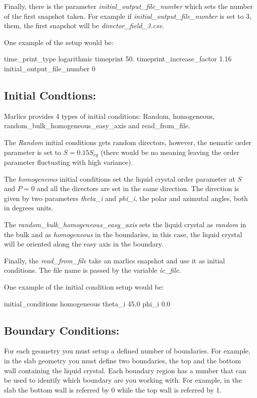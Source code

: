\documentclass{article}
\begin{document}
Finally, there is the parameter \textit{initial_output_file_number} which sets the number of the first snapshot taken. For example if \textit{initial_output_file_number} is set to 3, them, the first snapshot will be \textit{director_field_3.csv}.

One example of the setup would be:

time_print_type	          logarithmic
timeprint                 50.        %
timeprint_increase_factor 1.16       %
initial_output_file_number   0


\subsection{Initial Condtions:}

Marlics provides 4 types of initial conditions: Random, homogeneous, random_bulk_homogeneous_easy_axis and read_from_file.

The \textit{Random} initial conditions gets random directors, however, the nematic order parameter is set to $S=0.15 S_{eq}$ (there would be no meaning leaving the order parameter fluctuating with high variance).

The \textit{homogeneous} initial conditions set the liquid crystal order parameter at $S$ and $P=0$ and all the directors are set in the same direction. The direction is given by two parameters \textit{theta_i} and \textit{phi_i}, the polar and azimutal angles, both in degrees units.

The \textit{random_bulk_homogeneous_easy_axis} sets the liquid crystal as \textit{random} in the bulk and as \textit{homogeneous} in the boundaries, in this case, the liquid crystal will be oriented along the easy axis in the boundary.

Finally, the \textit{read_from_file} take an marlics snapshot and use it as initial conditions. The file name is passed by the variable \textit{ic_file}. 

One example of the initial condition setup would be:

initial_conditions homogeneous
theta_i 45.0
phi_i 0.0

\subsection{Boundary Conditions:}

For each geometry you must setup a defined number of boundaries. For example, in the slab geometry you must define two boundaries, the top and the bottom wall containing the liquid crystal. Each boundary region has a number that can be used to identify which boundary are you working with. For example, in the slab the bottom wall is referred by 0 while the top wall is referred by 1.
\end{document}
